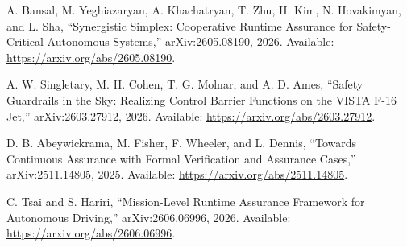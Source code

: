  A. Bansal, M. Yeghiazaryan, A. Khachatryan, T. Zhu, H. Kim, N. Hovakimyan, and L. Sha, ``Synergistic Simplex: Cooperative Runtime Assurance for Safety-Critical Autonomous Systems,'' arXiv:2605.08190, 2026. Available: \url{https://arxiv.org/abs/2605.08190}.

 A. W. Singletary, M. H. Cohen, T. G. Molnar, and A. D. Ames, ``Safety Guardrails in the Sky: Realizing Control Barrier Functions on the VISTA F-16 Jet,'' arXiv:2603.27912, 2026. Available: \url{https://arxiv.org/abs/2603.27912}.

 D. B. Abeywickrama, M. Fisher, F. Wheeler, and L. Dennis, ``Towards Continuous Assurance with Formal Verification and Assurance Cases,'' arXiv:2511.14805, 2025. Available: \url{https://arxiv.org/abs/2511.14805}.

 C. Tsai and S. Hariri, ``Mission-Level Runtime Assurance Framework for Autonomous Driving,'' arXiv:2606.06996, 2026. Available: \url{https://arxiv.org/abs/2606.06996}.
